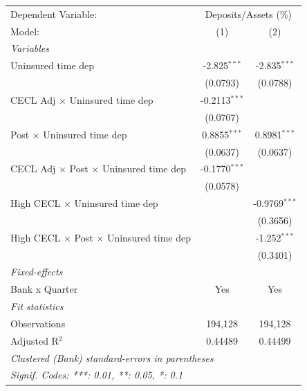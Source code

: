 
\begingroup
\centering
\begin{tabular}{lcc}
   \tabularnewline \midrule \midrule
   Dependent Variable: & \multicolumn{2}{c}{Deposits/Assets (\%)}\\
   Model:                                                & (1)             & (2)\\  
   \midrule
   \emph{Variables}\\
   Uninsured time dep                                    & -2.825$^{***}$  & -2.835$^{***}$\\   
                                                         & (0.0793)        & (0.0788)\\   
   CECL Adj $\times$ Uninsured time dep                  & -0.2113$^{***}$ &   \\   
                                                         & (0.0707)        &   \\   
   Post $\times$ Uninsured time dep                      & 0.8855$^{***}$  & 0.8981$^{***}$\\   
                                                         & (0.0637)        & (0.0637)\\   
   CECL Adj $\times$ Post $\times$ Uninsured time dep    & -0.1770$^{***}$ &   \\   
                                                         & (0.0578)        &   \\   
   High CECL $\times$ Uninsured time dep                 &                 & -0.9769$^{***}$\\   
                                                         &                 & (0.3656)\\   
   High CECL $\times$ Post $\times$ Uninsured time dep   &                 & -1.252$^{***}$\\   
                                                         &                 & (0.3401)\\   
   \midrule
   \emph{Fixed-effects}\\
   Bank x Quarter                                        & Yes             & Yes\\  
   \midrule
   \emph{Fit statistics}\\
   Observations                                          & 194,128         & 194,128\\  
   Adjusted R$^2$                                        & 0.44489         & 0.44499\\  
   \midrule \midrule
   \multicolumn{3}{l}{\emph{Clustered (Bank) standard-errors in parentheses}}\\
   \multicolumn{3}{l}{\emph{Signif. Codes: ***: 0.01, **: 0.05, *: 0.1}}\\
\end{tabular}
\par\endgroup


